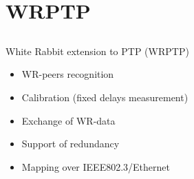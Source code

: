 \documentclass[compress,red]{beamer}
\begin{document}
\section{WRPTP}
\subsection{}
\begin{frame}{White Rabbit extension to PTP (WRPTP)}

  \begin{itemize}
    \item WR-peers recognition
    \item Calibration (fixed delays measurement)
    \item Exchange of WR-data
    \item Support of redundancy
    \item Mapping over IEEE802.3/Ethernet
  \end{itemize}

\end{frame}
\end{document}
